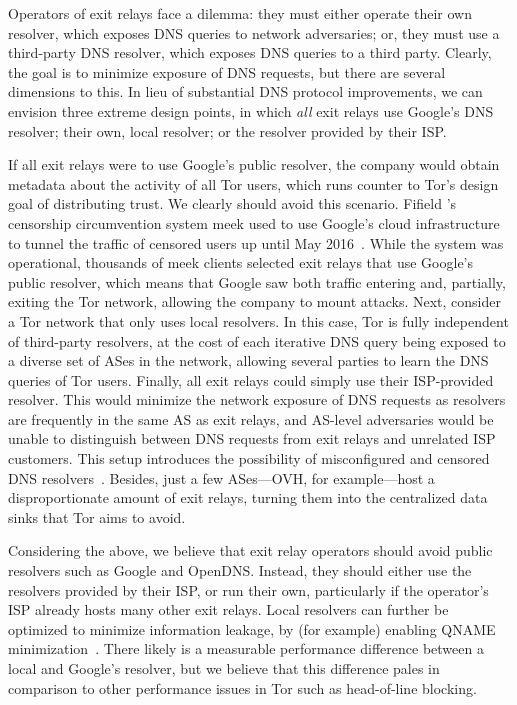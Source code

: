 Operators of exit relays face a dilemma: they must either operate their own
resolver, which exposes DNS queries to network adversaries; or, they must use a
third-party DNS resolver, which exposes DNS queries to a third party.  Clearly,
the goal is to minimize exposure of DNS requests, but there are several
dimensions to this.  In lieu of substantial DNS protocol improvements, we can
envision three extreme design points, in which \emph{all} exit relays use \first
Google's DNS resolver; \second their own, local resolver; or \third the resolver
provided by their ISP.

If all exit relays were to use Google's public resolver, the company would
obtain metadata about the activity of all Tor users, which runs counter to Tor's
design goal of distributing trust.  We clearly should avoid this scenario.
Fifield \ea's~\cite{Fifield2015a} censorship circumvention system meek used to
use Google's cloud infrastructure to tunnel the traffic of censored users up
until May 2016~\cite{meek-shutdown}.  While the system was operational,
thousands of meek clients selected exit relays that use Google's public
resolver, which means that Google saw both traffic entering and, partially,
exiting the Tor network, allowing the company to mount \name attacks.
Next, consider a Tor network that only uses local resolvers.  In this case, Tor
is fully independent of third-party resolvers, at the cost of each iterative DNS
query being exposed to a diverse set of ASes in the network, allowing several
parties to learn the DNS queries of Tor users.
Finally, all exit relays could simply use their ISP-provided resolver.  This
would minimize the network exposure of DNS requests as resolvers are frequently
in the same AS as exit relays, and AS-level adversaries would be unable to
distinguish between DNS requests from exit relays and unrelated ISP customers.
This setup introduces the possibility of misconfigured and censored DNS
resolvers~\cite[\S~4.1]{Winter2014b}.  Besides, just a few ASes---OVH, for
example---host a disproportionate amount of exit relays, turning them into the
centralized data sinks that Tor aims to avoid.

Considering the above, we believe that exit relay operators should avoid public
resolvers such as Google and OpenDNS.  Instead, they should either use the
resolvers provided by their ISP, or run their own, particularly if the
operator's ISP already hosts many other exit relays.  Local resolvers can
further be optimized to minimize information leakage, by (for example) enabling
QNAME minimization~\cite{Bortzmeyer2016a}.  There likely is a measurable
performance difference between a local and Google's resolver, but we believe
that this difference pales in comparison to other performance issues in Tor such
as head-of-line blocking.

